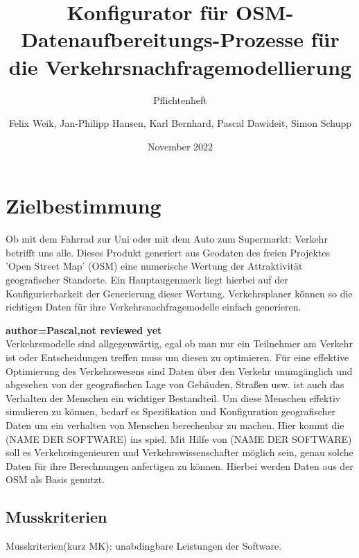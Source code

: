 \documentclass[parskip=full]{scrartcl} %
\title{Konfigurator für OSM-Datenaufbereitungs-Prozesse für die Verkehrsnachfragemodellierung}
\subtitle{Pflichtenheft}
\author{Felix Weik, Jan-Philipp Hansen, Karl Bernhard, Pascal Dawideit, Simon Schupp}
\date{November 2022}
\begin{document}
\maketitle
\newpage

\tableofcontents
\newpage




\section{Zielbestimmung}
Ob mit dem Fahrrad zur Uni oder mit dem Auto zum Supermarkt: Verkehr betrifft uns alle. Dieses Produkt generiert aus Geodaten des freien Projektes 'Open Street Map' (OSM) eine numerische Wertung der Attraktivität geografischer Standorte. Ein Hauptaugenmerk liegt hierbei auf der Konfigurierbarkeit der Generierung dieser Wertung. Verkehrsplaner können so die richtigen Daten für ihre Verkehrsnachfragemodelle einfach generieren.


\textbf{author=Pascal,not reviewed yet\\}
Verkehrsmodelle sind allgegenwärtig, egal ob man nur ein Teilnehmer am Verkehr ist oder Entscheidungen treffen muss um diesen zu optimieren.
Für eine effektive Optimierung des Verkehrswesens sind Daten über den Verkehr unumgänglich und abgesehen von der geografischen Lage von Gebäuden, Straßen usw. ist auch das Verhalten der Menschen ein wichtiger Bestandteil.
Um diese Menschen effektiv simulieren zu können, bedarf es Spezifikation und Konfiguration geografischer Daten um ein verhalten von Menschen berechenbar zu machen.
Hier kommt die (NAME DER SOFTWARE) ins spiel.
Mit Hilfe von (NAME DER SOFTWARE) soll es  Verkehrsingenieuren und Verkehrswissenschafter möglich sein, genau solche Daten für ihre Berechnungen anfertigen zu können.
Hierbei werden Daten aus der OSM als Basis genutzt.

\subsection{Musskriterien}
Musskriterien(kurz MK): unabdingbare Leistungen der Software.
\end{document}
